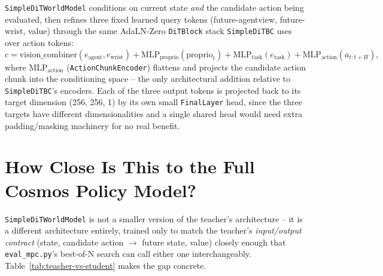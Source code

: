 \documentclass[11pt]{article}
\begin{document}
\texttt{SimpleDiTWorldModel} conditions on current state \emph{and} the candidate action being
evaluated, then refines three fixed learned query tokens (future-agentview, future-wrist, value)
through the same AdaLN-Zero \texttt{DiTBlock} stack \texttt{SimpleDiTBC} uses over action tokens:
\begin{equation}
    c = \text{vision\_combiner}(e_{\text{agent}}, e_{\text{wrist}})
        + \text{MLP}_{\text{proprio}}(\text{proprio}_t)
        + \text{MLP}_{\text{task}}(e_{\text{task}})
        + \text{MLP}_{\text{action}}(a_{t:t+H}),
\end{equation}
where $\text{MLP}_{\text{action}}$ (\texttt{ActionChunkEncoder}) flattens and projects the
candidate action chunk into the conditioning space -- the only architectural addition relative to
\texttt{SimpleDiTBC}'s encoders. Each of the three output tokens is projected back to its target
dimension (256, 256, 1) by its own small \texttt{FinalLayer} head, since the three targets have
different dimensionalities and a single shared head would need extra padding/masking machinery
for no real benefit.

\section{How Close Is This to the Full Cosmos Policy Model?}

\texttt{SimpleDiTWorldModel} is not a smaller version of the teacher's architecture -- it is a
different architecture entirely, trained only to match the teacher's \emph{input/output contract}
(state, candidate action $\to$ future state, value) closely enough that \texttt{eval\_mpc.py}'s
best-of-N search can call either one interchangeably. Table~\ref{tab:teacher-vs-student} makes the
gap concrete.
\end{document}
